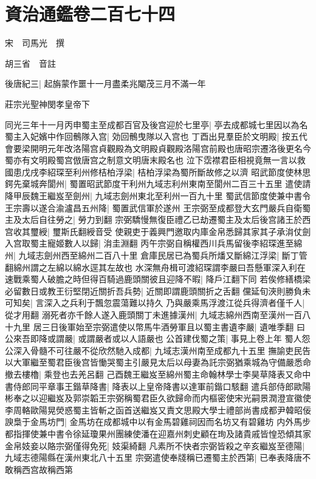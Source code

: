 \chapter{資治通鑑卷二百七十四}
宋　司馬光　撰

胡三省　音註

後唐紀三|{
	起旃蒙作噩十一月盡柔兆閹茂三月不滿一年}


莊宗光聖神閔孝皇帝下

同光三年十一月丙申蜀主至成都百官及後宫迎於七里亭|{
	亭去成都城七里因以為名}
蜀主入妃嬪中作回鶻隊入宫|{
	効回鶻曳隊以入宫也}
丁酉出見羣臣於文明殿|{
	按五代會要梁開明元年改洛陽宫貞觀殿為文明殿貞觀殿洛陽宫前殿也唐昭宗遷洛後更名今蜀亦有文明殿蜀宫倣唐宫之制意文明唐末殿名也}
泣下霑襟君臣相視竟無一言以救國患戊戌李紹琛至利州修桔柏浮梁|{
	桔柏浮梁為蜀所斷故修之以濟}
昭武節度使林思鍔先棄城奔閬州|{
	蜀置昭武節度干利州九域志利州東南至閬州二百三十五里}
遣使請降甲辰魏王繼岌至劍州|{
	九域志劍州東北至利州一百九十里}
蜀武信節度使兼中書令王宗壽以遂合渝瀘昌五州降|{
	蜀置武信軍於遂州}
王宗弼至成都登大玄門嚴兵自衛蜀主及太后自往勞之|{
	勞力到翻}
宗弼驕慢無復臣禮乙已劫遷蜀主及太后後宫諸王於西宫收其璽綬|{
	璽斯氏翻綬音受}
使親吏于義興門邀取内庫金帛悉歸其家其子承㳙仗劍入宫取蜀主寵姬數人以歸|{
	㳙圭淵翻}
丙午宗弼自稱權西川兵馬留後李紹琛進至綿州|{
	九域志劍州西至綿州二百八十里}
倉庫民居已為蜀兵所燔又斷綿江浮梁|{
	斷丁管翻綿州謂之左綿以綿水逕其左故也}
水深無舟楫可渡紹琛謂李嚴曰吾懸軍深入利在速戰乘蜀人破膽之時但得百騎過鹿頭關彼且迎降不暇|{
	降戶江翻下同}
若俟修繕橋梁必留數日或教王衍堅閉近關折吾兵勢|{
	近關即謂鹿頭關折之舌翻}
儻延旬浹則勝負未可知矣|{
	言深入之兵利于飄忽震蕩難以持久}
乃與嚴乘馬浮渡江從兵得濟者僅千人|{
	從才用翻}
溺死者亦千餘人遂入鹿頭關丁未進據漢州|{
	九域志綿州西南至漢州一百八十九里}
居三日後軍始至宗弼遣使以幣馬牛酒勞軍且以蜀主書遺李嚴|{
	遺唯季翻}
曰公來吾即降或謂嚴|{
	或謂嚴者或以人語嚴也}
公首建伐蜀之策|{
	事見上卷上年}
蜀人怨公深入骨髓不可往嚴不從欣然馳入成都|{
	九域志漢州南至成都九十五里}
撫諭吏民告以大軍繼至蜀君臣後宫皆慟哭蜀主引嚴見太后以母妻為託宗弼猶乘城為守備嚴悉命撤去樓櫓|{
	乘登也去羌呂翻}
己酉魏王繼岌至綿州蜀主命翰林學士李昊草降表又命中書侍郎同平章事王鍇草降書|{
	降表以上皇帝降書以達軍前鍇口駭翻}
遣兵部侍郎歐陽彬奉之以迎繼岌及郭崇韜王宗弼稱蜀君臣久欲歸命而内樞密使宋光嗣景潤澄宣徽使李周輅歐陽晃熒惑蜀主皆斬之函首送繼岌又責文思殿大學士禮部尚書成都尹韓昭佞諛梟于金馬坊門|{
	金馬坊在成都城中以有金馬碧雞祠因而名坊又有碧雞坊}
内外馬步都指揮使兼中書令徐延瓊果州團練使潘在迎嘉州刺史顧在珣及諸貴戚皆惶恐傾其家金帛妓妾以賂宗弼僅得免死|{
	妓渠綺翻}
凡素所不快者宗弼皆殺之辛亥繼岌至德陽|{
	九域志德陽縣在漢州東北八十五里}
宗弼遣使奉牋稱已遷蜀主於西第|{
	已奉表降唐不敢稱西宫故稱西第}
